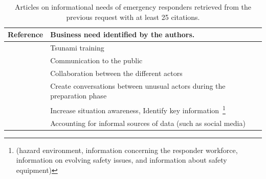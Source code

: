 \begin{table}[bp]
    \centering
    \renewcommand{\arraystretch}{1.5}
    \caption{Articles on informational needs of emergency responders retrieved from the previous request with at least 25 citations.}
    \begin{tabular}{m{} m{}}
        Reference                                                   & Business need identified by the authors.                                                                                                                                                                              \\ [0.5ex]
        \toprule
        \cite{lindellTsunamiPreparednessOregon2010}                 & Tsunami training                                                                                                                                                                                                      \\
        \cite{aloudatRegulationUbiquitousMobile2011}                & Communication to the public                                                                                                                                                                                           \\
        \cite{berlinWhyCollaborationMinimised2011}                  & Collaboration between the different actors                                                                                                                                                                            \\
        \cite{parkerSurfaceWaterFlood2011}                          & Create conversations between unusual actors during the preparation phase                                                                                                                                              \\
        \cite{yangDesignPrinciplesIntegrated2012}                   & Increase situation awareness, Identify key information~\footnote{(hazard environment, information concerning the responder workforce, information on evolving safety issues, and information about safety equipment)} \\
        \cite{tapiaTrustworthyTweetDeeper2013}                      & Accounting for informal sources of data (such as social media)                                                                                                                                                        \\

\end{tabular}
\end{table}
